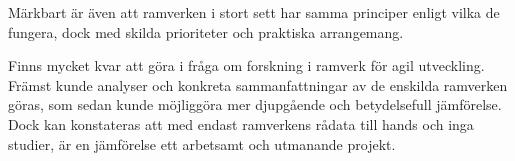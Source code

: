 		
		Märkbart är även att ramverken i stort sett har samma principer enligt vilka de fungera, dock med skilda prioriteter och praktiska arrangemang.
		
		
		Finns mycket kvar att göra i fråga om forskning i ramverk för agil utveckling. Främst kunde analyser och konkreta sammanfattningar av de enskilda ramverken göras, som sedan kunde möjliggöra mer djupgående och betydelsefull jämförelse. Dock kan konstateras att med endast ramverkens rådata till hands och inga studier, är en jämförelse ett arbetsamt och utmanande projekt.
		
	

	